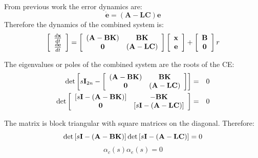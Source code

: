 From previous work the error dynamics are:
\[
\dot{\mathbf{e}} = (\mathbf{A}-\mathbf{LC})\mathbf{e}
\]
Therefore the dynamics of the combined system is:
\[\left[ {\begin{array}{*{20}c}
   {\frac{{d{\bf{x}}}}{{dt}}}  \\
   {\frac{{d{\bf{e}}}}{{dt}}}  \\
\end{array}} \right] = \left[ {\begin{array}{*{20}c}
   {\left( {{\bf{A}} - {\bf{BK}}} \right)} & {{\bf{BK}}}  \\
   {\bf{0}} & {\left( {{\bf{A}} - {\bf{LC}}} \right)}  \\
\end{array}} \right]\left[ {\begin{array}{*{20}c}
   {\bf{x}}  \\
   {\bf{e}}  \\
\end{array}} \right] + \left[ {\begin{array}{*{20}c}
   {\bf{B}}  \\
   {\bf{0}}  \\
\end{array}} \right]r
\]

The eigenvalues or poles of the combined system are the roots of the CE:
\begin{eqnarray*}
	\det \left[ {s{\bf{I}}_{2n}  - \left[ {\begin{array}{*{20}c}
	   {\left( {{\bf{A}} - {\bf{BK}}} \right)} & {{\bf{BK}}}  \\
	   {\bf{0}} & {\left( {{\bf{A}} - {\bf{LC}}} \right)}  \\
	\end{array}} \right]} \right] & = &  0 \\
	\det \left[ {\begin{array}{*{20}c}
	   {\left[ {s{\bf{I}} - \left( {{\bf{A}} - {\bf{BK}}} \right)} \right]} & { - {\bf{BK}}}  \\
	   {\bf{0}} & {\left[ {s{\bf{I}} - \left( {{\bf{A}} - {\bf{LC}}} \right)} \right]}  \\
	\end{array}} \right] & = & 0
\end{eqnarray*}
 
The matrix is block triangular with square matrices on the diagonal. Therefore:
\[
	\det \left[ {s{\bf{I}} - \left( {{\bf{A}} - {\bf{BK}}} \right)} \right]\det\left[ {s{\bf{I}} - \left( {{\bf{A}} - {\bf{LC}}} \right)} \right] = 0 
\]
\[
	\alpha_c(s)\alpha_e(s) = 0 
\]
 

